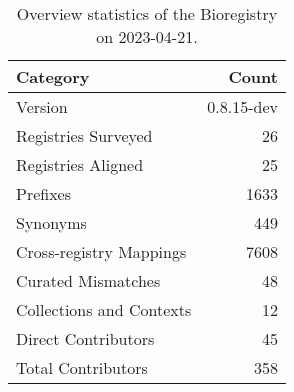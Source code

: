 \begin{table}
\caption{Overview statistics of the Bioregistry on 2023-04-21.}
\label{tab:bioregistry-summary}
\begin{tabular}{lr}
\toprule
Category & Count \\
\midrule
Version & 0.8.15-dev \\
Registries Surveyed & 26 \\
Registries Aligned & 25 \\
Prefixes & 1633 \\
Synonyms & 449 \\
Cross-registry Mappings & 7608 \\
Curated Mismatches & 48 \\
Collections and Contexts & 12 \\
Direct Contributors & 45 \\
Total Contributors & 358 \\
\bottomrule
\end{tabular}
\end{table}
